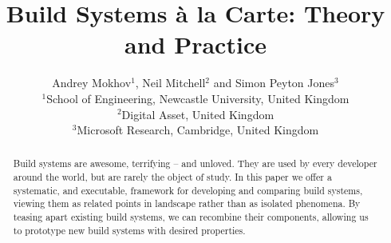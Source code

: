 \documentclass{jfp1}
\newcommand{\cmd}[1]{\textsf{\color[rgb]{0,0,0.5} #1}}
\begin{document}
\title[Build Systems \`a la Carte: Theory and Practice]
{Build Systems \`a la Carte: Theory and Practice}

\author[Andrey Mokhov, Neil Mitchell and Simon Peyton Jones]
{Andrey Mokhov$^1$, Neil Mitchell$^2$ and Simon Peyton Jones$^3$\\
$^1$School of Engineering, Newcastle University, United Kingdom\\
$^2$Digital Asset, United Kingdom\\
$^3$Microsoft Research, Cambridge, United Kingdom}




\maketitle

\begin{abstract}
Build systems are awesome, terrifying -- and unloved. They are used by every
developer around the world, but are rarely the object of study. In this paper we
offer a systematic, and executable, framework for developing and comparing build
systems, viewing them as related points in landscape rather than as isolated
phenomena. By teasing apart existing build systems, we can recombine their
components, allowing us to prototype new build systems with desired properties.
\end{abstract}
















\appendix
% 
\end{document}
